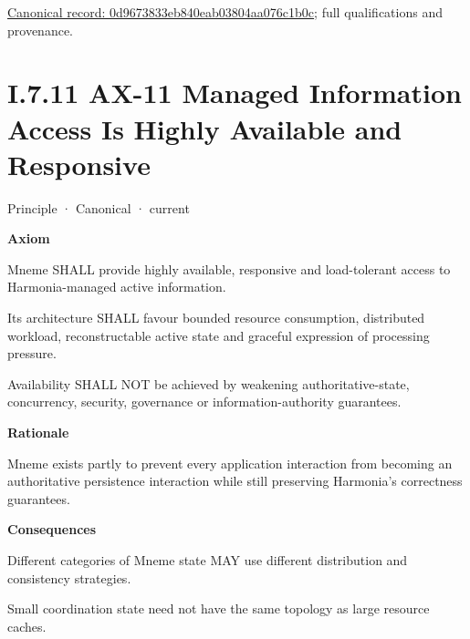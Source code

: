 {\footnotesize \href{../../../../../../../continuum/motivation/principle/0d9673833eb840eab03804aa076c1b0c.md}{Canonical record: 0d9673833eb840eab03804aa076c1b0c}; full qualifications and provenance.}\par
\section*{I.7.11 AX-11 Managed Information Access Is Highly Available and Responsive}
\label{navigation:I.7.11}

\label{element:8a1e995f16954484a78ae1c5c114d546}
{\small Principle · Canonical · current}\par

\par\medskip\textbf{Axiom}\par


Mneme SHALL provide highly available, responsive and load-tolerant
access to Harmonia-managed active information.



Its architecture SHALL favour bounded resource consumption, distributed
workload, reconstructable active state and graceful expression of
processing pressure.



Availability SHALL NOT be achieved by weakening authoritative-state,
concurrency, security, governance or information-authority guarantees.



\par\medskip\textbf{Rationale}\par


Mneme exists partly to prevent every application interaction from
becoming an authoritative persistence interaction while still preserving
Harmonia's correctness guarantees.



\par\medskip\textbf{Consequences}\par


Different categories of Mneme state MAY use different distribution and
consistency strategies.



Small coordination state need not have the same topology as large
resource caches.



